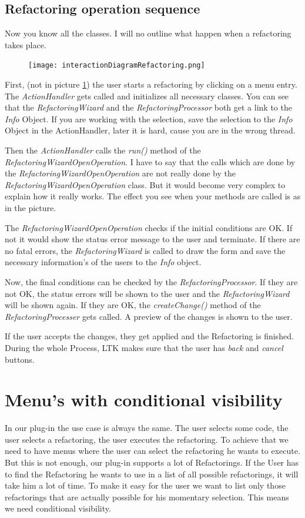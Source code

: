 \documentclass[a4paper,10pt]{report}
\begin{document}
\section{Refactoring operation sequence}
\label{refactoringOperationSequence}
Now you know all the classes. I will no outline what happen when a refactoring takes place. 
\begin{figure}[h]
\centering
\texttt{[image: interactionDiagramRefactoring.png]}
\label{ interactionDiagramRefactoring }
\end{figure}
First, (not in picture \ref{ interactionDiagramRefactoring }) the user starts a refactoring by clicking on a menu entry. The {\it ActionHandler} gets called and initializes all necessary classes.
You can see that the {\it RefactoringWizard} and the {\it RefactoringProcessor} both get a link to the {\it Info} Object. If you are working with the selection, save
the selection to the {\it Info} Object in the ActionHandler, later it is hard, cause you are in the wrong thread.

Then the {\it ActionHandler} calls the {\it run()} method of the {\it RefactoringWizardOpenOperation}. I have to say that the calls which are done by the
{\it RefactoringWizardOpenOperation} are not really done by the {\it RefactoringWizardOpenOperation} class. But it would become very complex to explain how it really works.
The effect you see when your methods are called is as in the picture.

The {\it RefactoringWizardOpenOperation} checks if the initial conditions are OK. If not it would show the status error message to the user and terminate. If there
are no fatal errors, the {\it RefactoringWizard} is called to draw the form and save the necessary information's of the users to the {\it Info} object.

Now, the final conditions can be checked by the {\it RefactoringProcessor}. If they are not OK, the status errors will be shown to the user and the {\it RefactoringWizard}
will be shown again. If they are OK, the {\it createChange()} method of the {\it RefactoringProcesser} gets called. A preview of the changes is shown to the user.

If the user accepts the changes, they get applied and the Refactoring is finished. During the whole Process, LTK makes sure that the user has {\it back} and {\it cancel} buttons.

\chapter{Menu's with conditional visibility}
\label{menuWithConditionalVisibility}
In our plug-in the use case is always the same. The user selects some code, the user selects a refactoring, the user executes the refactoring. To achieve that we need to have menus where the user can select the refactoring he wants to execute.
But this is not enough, our plug-in supports a lot of Refactorings. If the User has to find the Refactoring he wants to use in a list of all possible refactorings, it will take him a lot of time.
To make it easy for the user we want to list only those refactorings that are actually possible for his momentary selection. This means we need conditional visibility.
\end{document}
